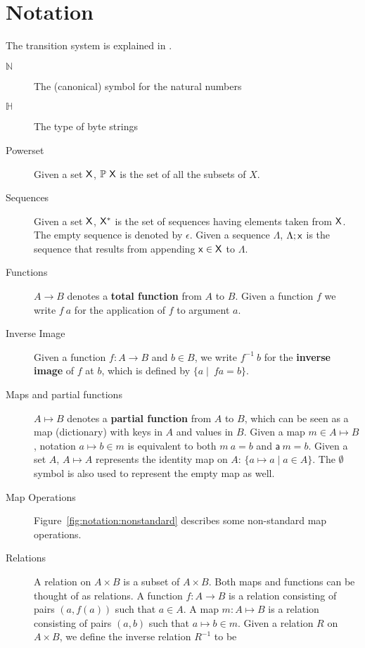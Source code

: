 \section{Notation}
\label{sec:notation-shelley}

The transition system is explained in \cite{small_step_semantics}.

\begin{description}
  \item[$\mathbb{N}$] The (canonical) symbol for the natural numbers
  \item[$\mathbb{H}$] The type of byte strings
  \item[Powerset] Given a set $\mathsf{X}$, $\mathbb{P}~\mathsf{X}$ is the set of all
    the subsets of $X$.
  \item[Sequences] Given a set $\mathsf{X}$, $\mathsf{X}^{*}$ is the set of
    sequences having elements taken from $\mathsf{X}$. The empty sequence is
    denoted by $\epsilon$. Given a sequence $\Lambda$, $\Lambda; \mathsf{x}$ is
    the sequence that results from appending $\mathsf{x} \in \mathsf{X}$ to
    $\Lambda$.
  \item[Functions] $A \to B$ denotes a \textbf{total function} from $A$ to $B$.
    Given a function $f$ we write $f~a$ for the application of $f$ to argument
    $a$.
  \item[Inverse Image] Given a function $f: A \to B$ and $b\in B$, we write
    $f^{-1}~b$ for the \textbf{inverse image} of $f$ at $b$, which is defined by
    $\{a \mid\ f a =  b\}$.
  \item[Maps and partial functions] $A \mapsto B$ denotes a \textbf{partial
    function} from $A$ to $B$, which can be seen as a map (dictionary) with
    keys in $A$ and values in $B$. Given a map $m \in A \mapsto B$, notation
    $a \mapsto b \in m$ is equivalent to both $m~ a = b$ and $\mathsf{a}~m = b$.
    Given a set $A$, $A \mapsto A$ represents the identity map on $A$:
    $\{a \mapsto a \mid a \in A\}$. The $\emptyset$ symbol is also used to
    represent the empty map as well.
  \item[Map Operations] Figure~\ref{fig:notation:nonstandard}
    describes some non-standard map operations.
  \item[Relations] A relation on $A\times B$ is a subset of $A\times B$.
    Both maps and functions can be thought of as relations.
    A function $f:A\to B$ is a relation consisting of pairs $(a, f(a))$ such that $a\in A$.
    A map $m: A\mapsto B$ is a relation consisting of pairs $(a, b)$ such that
    $a\mapsto b \in m$.
    Given a relation $R$ on $A\times B$, we define the inverse relation $R^{-1}$ to be

\end{description}
